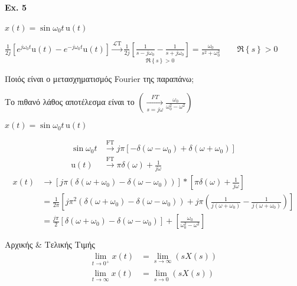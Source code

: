     \paragraph{Ex. 5}
    \( x(t)=\sin\omega_0 t\, \mathrm u(t) \)

    \( \displaystyle
    \frac{1}{2j}\left[
    e^{j\omega_0 t}\mathrm u(t)-e^{-j\omega_0 t}\mathrm u(t)
    \right] \xrightarrow{\mathscr L \mathrm T}
    \frac{1}{2j}\underset{\Re\left\lbrace s \right\rbrace>0}{
        \left[ \frac{1}{s-j\omega_0} - \frac{1}{s+j\omega_0} \right]
    } = \frac{\omega_0}{s^2+\omega_0^2}
     \qquad \Re \left\lbrace s \right\rbrace > 0
     \)

    Ποιός είναι ο μετασχηματισμός Fourier της παραπάνω;

    Το πιθανό λάθος αποτέλεσμα είναι το \(
    \displaystyle \left(
    \xrightarrow[s=j\omega ]{FT} \frac{\omega_0}{\omega_0^2-\omega^2}
    \right)
     \)

    \( x(t) = \sin\omega_0t\, \mathrm u(t) \)

    \begin{align*}
    \sin\omega_0 t &\xrightarrow{\mathrm{FT}} j\pi\left[
    -\delta(\omega-\omega_0)+\delta(\omega +\omega_0)
    \right] \\
    \mathrm u(t) &\xrightarrow{\mathrm{FT}} \pi\delta(\omega )+\frac{1}{j\omega }
    \end{align*}
    \begin{align*}
    x(t) &\to \left[
    j\pi\left(\delta(\omega +\omega_0)-\delta(\omega -\omega_0) \right)
    \right] * \left[
    \pi\delta(\omega )+\frac{1}{j\omega }
    \right] \\
    &= \frac{1}{2\pi}\left[
    j\pi^2\left(
    \delta(\omega+\omega_0)-\delta(\omega-\omega_0)
    \right) +j\pi\left(
    \frac{1}{j(\omega+\omega_0)}-\frac{1}{j(\omega+\omega_0)}
    \right)    \right]
    \\ &= \frac{j\pi}{2}\left[
    \delta(\omega +\omega_0)-\delta(\omega-\omega_0)\right]+\left[
    \frac{\omega_0}{\omega_0^2-\omega^2}
    \right]
    \end{align*}

    \begin{theorem*}[title=Θεωρήματα Αρχικής \& Τελικής Τιμής,width=.5\textwidth]%
        {Αρχικής \& Τελικής Τιμής}
    \begin{align*}
    \lim_{t\to 0^+} x(t) &= \lim_{s\to \infty} \left( sX(s) \right) \\
    \lim_{t\to \infty} x(t) &= \lim_{s\to 0} \left( sX(s) \right)
    \end{align*}
    \end{theorem*}

